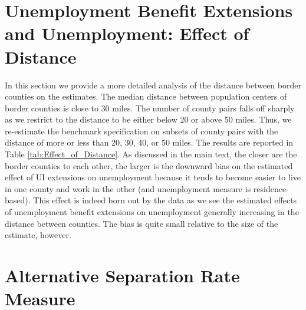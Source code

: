 \documentclass[12pt]{article}
\newcommand{\1}{\mathbf{1}}
\begin{document}
\begin{appendix}
\clearpage
\section{Unemployment Benefit Extensions and Unemployment: Effect of Distance}
\label{app:benefits_and_unemployment_distance}
In this section we provide a more detailed analysis of the distance between border counties on the estimates. The median distance between population centers of border counties is close to 30 miles. The number of county pairs falls off sharply as we restrict to the distance to be either below 20 or above 50 miles. Thus, we re-estimate the benchmark specification on subsets of county pairs with the distance of more or less than 20, 30, 40, or 50 miles. The results are reported in Table \ref{tab:Effect_of_Distance}. As discussed in the main text, the closer are the border counties to each other, the larger is the downward bias on the estimated effect of UI extensions on unemployment because it tends to become easier to live in one county and work in the other (and unemployment measure is residence-based). This effect is indeed born out by the data as we see the estimated effects of unemployment benefit extensions on unemployment generally increasing in the distance between counties. The bias is quite small relative to the size of the estimate, however.

\vspace{0.5cm}\begin{table}[ht]
  \centering
   \caption{Unemployment Benefit Extensions and Unemployment: Effect of Distance} \label{tab:Effect_of_Distance}
\small

\vspace{-0.2cm}
\end{table}

\section{Alternative Separation Rate Measure}
\label{app:alt_sep}


\end{appendix}
\end{document}
